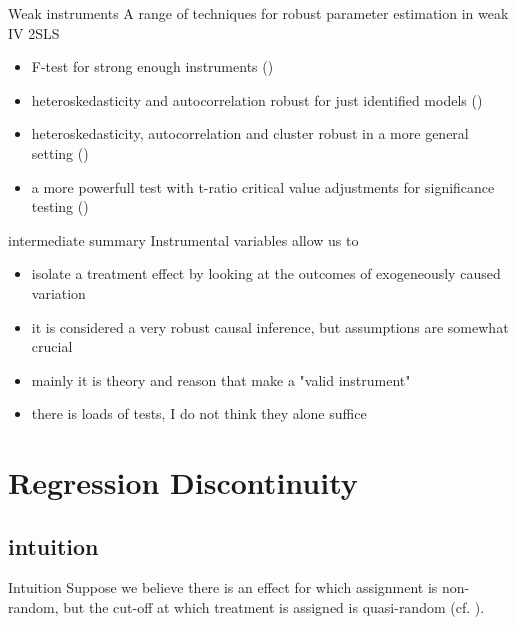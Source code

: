 \documentclass[aspectratio=169]{beamer}
\begin{document}
		\begin{frame}{Weak instruments}
			A range of techniques for robust parameter estimation in weak IV 2SLS \\ \vspace*{.15cm}
			\begin{itemize}
			 \item<1-> F-test for strong enough instruments (\cite{Stock2003})
			 \item<2-> heteroskedasticity and autocorrelation robust for just identified models (\cite{Chernozhukov2008})
			 \item<3-> heteroskedasticity, autocorrelation and cluster robust in a more general setting (\cite{Montiel2013})
			 \item<4-> a more powerfull test with t-ratio critical value adjustments for significance testing (\cite{Lee2020})
		 	\end{itemize}
			\vspace*{.15cm}
		\end{frame}

		\begin{frame}{intermediate summary}
			Instrumental variables allow us to \\ \vspace*{.5cm}
			\begin{itemize}
				\item isolate a treatment effect by looking at the outcomes of exogeneously caused variation
				\item it is considered a very robust causal inference, but assumptions are somewhat crucial
				\item mainly it is theory and reason that make a "valid instrument"
				\item there is loads of tests, I do not think they alone suffice
			\end{itemize}
		\end{frame}

\section{Regression Discontinuity}
	\subsection{intuition}
		\begin{frame}{Intuition}
			Suppose we believe there is an effect for which assignment is non-random, but the cut-off at which treatment is assigned is quasi-random (cf. \cite{Thistlewaite2016}). \\ \vspace*{.15cm}
			\begin{center}
			\end{center}
		\end{frame}
\end{document}
